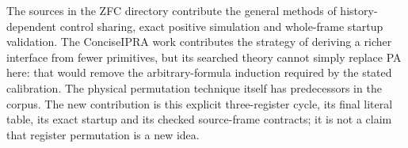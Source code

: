 The sources in the ZFC directory contribute the general methods of
history-dependent control sharing, exact positive simulation and
whole-frame startup validation.  The ConciseIPRA work contributes the
strategy of deriving a richer interface from fewer primitives, but
its searched theory cannot simply replace PA here: that would remove
the arbitrary-formula induction required by the stated calibration.
The physical permutation technique itself has predecessors in the
corpus.  The new contribution is this explicit three-register cycle,
its final literal table, its exact startup and its checked source-frame
contracts; it is not a claim that register permutation is a new idea.
